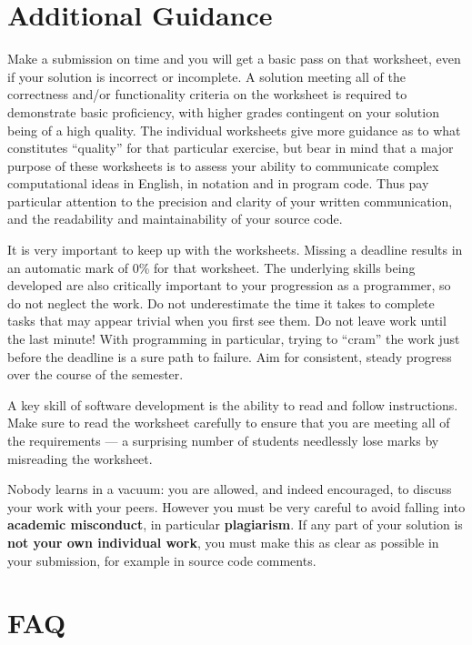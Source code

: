 \documentclass{../../fal_assignment}
\begin{document}
\section*{Additional Guidance}

Make a submission on time and you will get a basic pass on that worksheet,
even if your solution is incorrect or incomplete.
A solution meeting all of the correctness and/or functionality criteria on the worksheet is required to demonstrate basic proficiency,
with higher grades contingent on your solution being of a high quality.
The individual worksheets give more guidance as to what constitutes ``quality'' for that particular exercise,
but bear in mind that a major purpose of these worksheets is to assess your ability to communicate
complex computational ideas in English, in notation and in program code.
Thus pay particular attention to the precision and clarity of your written communication,
and the readability and maintainability of your source code.

It is very important to keep up with the worksheets. Missing a deadline results in an automatic mark of 0\% for that worksheet.
The underlying skills being developed are also critically important to your progression as a programmer, so do not neglect the work.
Do not underestimate the time it takes to complete tasks that may appear trivial when you first see them.
Do not leave work until the last minute! With programming in particular, trying to ``cram'' the work just before the deadline is a sure path to failure. Aim for consistent, steady progress over the course of the semester.

A key skill of software development is the ability to read and follow instructions.
Make sure to read the worksheet carefully to ensure that you are meeting all of the requirements ---
a surprising number of students needlessly lose marks by misreading the worksheet.

Nobody learns in a vacuum: you are allowed, and indeed encouraged, to discuss your work with your peers. However you must be very careful to avoid falling into \textbf{academic misconduct}, in particular \textbf{plagiarism}. If any part of your solution is \textbf{not your own individual work}, you must make this as clear as possible in your submission, for example in source code comments.

\section*{FAQ}
\end{document}
